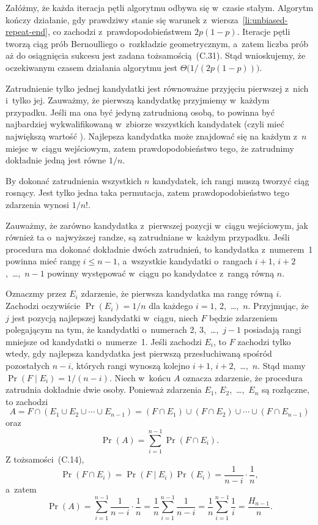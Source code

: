 Załóżmy, że każda iteracja pętli algorytmu odbywa się w~czasie stałym. Algorytm kończy działanie, gdy prawdziwy stanie się warunek z~wiersza~\ref{li:unbiased-repeat-end}, co zachodzi z~prawdopodobieństwem $2p(1-p)$. Iteracje pętli tworzą ciąg prób Bernoulliego o~rozkładzie geometrycznym, a~zatem liczba prób aż do osiągnięcia sukcesu jest zadana tożsamością~(C.31). Stąd wnioskujemy, że oczekiwanym czasem działania algorytmu jest $\Theta\bigl(1/(2p(1-p))\bigr)$.


\exercise %
Zatrudnienie tylko jednej kandydatki jest równoważne przyjęciu pierwszej z~nich i~tylko jej. Zauważmy, że pierwszą kandydatkę przyjmiemy w~każdym przypadku. Jeśli ma ona być jedyną zatrudnioną osobą, to powinna być najbardziej wykwalifikowaną w~zbiorze wszystkich kandydatek (czyli mieć największą wartość ). Najlepsza kandydatka może znajdować się na każdym z~$n$ miejsc w~ciągu wejściowym, zatem prawdopodobieństwo tego, że zatrudnimy dokładnie jedną jest równe $1/n$.

By dokonać zatrudnienia wszystkich $n$ kandydatek, ich rangi muszą tworzyć ciąg rosnący. Jest tylko jedna taka permutacja, zatem prawdopodobieństwo tego zdarzenia wynosi $1/n!$.

\exercise %
Zauważmy, że zarówno kandydatka z~pierwszej pozycji w~ciągu wejściowym, jak również ta o~najwyższej randze, są zatrudniane w~każdym przypadku. Jeśli procedura  ma dokonać dokładnie dwóch zatrudnień, to kandydatka z~numerem~1 powinna mieć rangę $i\le n-1$, a~wszystkie kandydatki o~rangach $i+1$, $i+2$,~\dots,~$n-1$ powinny występować w~ciągu po kandydatce z~rangą równą $n$.

Oznaczmy przez $E_i$ zdarzenie, że pierwsza kandydatka ma rangę równą $i$. Zachodzi oczywiście $\Pr(E_i)=1/n$ dla każdego $i=1$, 2,~\dots,~$n$. Przyjmując, że $j$ jest pozycją najlepszej kandydatki w~ciągu, niech $F$ będzie zdarzeniem polegającym na tym, że kandydatki o~numerach 2, 3,~\dots,~$j-1$ posiadają rangi mniejsze od kandydatki o~numerze~1. Jeśli zachodzi $E_i$, to $F$ zachodzi tylko wtedy, gdy najlepsza kandydatka jest pierwszą przesłuchiwaną spośród pozostałych $n-i$, których rangi wynoszą kolejno $i+1$, $i+2$,~\dots,~$n$. Stąd mamy $\Pr(F\mid E_i)=1/(n-i)$. Niech w~końcu $A$ oznacza zdarzenie, że procedura  zatrudnia dokładnie dwie osoby. Ponieważ zdarzenia $E_1$, $E_2$,~\dots,~$E_n$ są rozłączne, to zachodzi
\[
	A = F\cap(E_1\cup E_2\cup\cdots\cup E_{n-1}) = (F\cap E_1)\cup(F\cap E_2)\cup\cdots\cup(F\cap E_{n-1})
\]
oraz
\[
	\Pr(A) = \sum_{i=1}^{n-1}\Pr(F\cap E_i).
\]
Z tożsamości~(C.14),
\[
	\Pr(F\cap E_i) = \Pr(F\mid E_i)\Pr(E_i) = \frac{1}{n-i}\cdot\frac{1}{n},
\]
a~zatem
\[
	\Pr(A) = \sum_{i=1}^{n-1}\frac{1}{n-i}\cdot\frac{1}{n} = \frac{1}{n}\sum_{i=1}^{n-1}\frac{1}{n-i} = \frac{1}{n}\sum_{i=1}^{n-1}\frac{1}{i} = \frac{H_{n-1}}{n}.
\]


